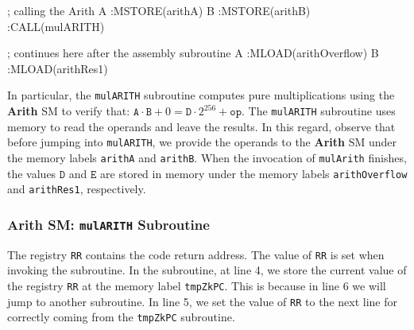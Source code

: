 \begin{zkasm}
; calling the Arith
   A         :MSTORE(arithA)
   B         :MSTORE(arithB)
             :CALL(mulARITH)

; continues here after the assembly subroutine
   A         :MLOAD(arithOverflow) 
   B         :MLOAD(arithRes1)
\end{zkasm}

In particular, the \texttt{mulARITH} subroutine computes pure multiplications using the \textbf{Arith} SM to verify that: $\texttt{A} \cdot \mathtt{B}+0 = \mathtt{D} \cdot 2^{256} + \mathtt{op}$. The \texttt{mulARITH} subroutine uses memory to read the operands and leave the results. In this regard, observe that before jumping into \texttt{mulARITH}, we provide the operands to the \textbf{Arith} SM under the memory labels \texttt{arithA} and \texttt{arithB}. When the invocation of \texttt{mulArith} finishes, the values $\texttt{D}$ and $\texttt{E}$ are stored in memory under the memory labels \texttt{arithOverflow} and \texttt{arithRes1}, respectively. 



\subsubsection{Arith SM: \texttt{mulARITH} Subroutine}



The registry \texttt{RR} contains the code return address. The value of \texttt{RR} is set when invoking the subroutine. In the subroutine, at line 4, we store the current value of the registry \texttt{RR} at the memory label \texttt{tmpZkPC}. This is because in line 6 we will jump to another subroutine. In line 5, we set the value of \texttt{RR} to the next line for correctly coming from the \texttt{tmpZkPC} subroutine.



